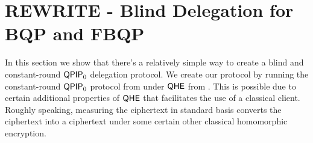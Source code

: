 \section{REWRITE - Blind Delegation for BQP and FBQP}
\label{sec:BlindBQP2}

In this section we show that there's a relatively simple way to create a blind and constant-round $\operatorname{\mathsf{QPIP}}_0$ delegation protocol. We create our protocol by running the constant-round $\operatorname{\mathsf{QPIP}}_0$ protocol from \cite{FOCS:Mahadev18a} under $\mathsf{QHE}$ from \cite{mahadev_qfhe}. This is possible due to certain additional properties of $\mathsf{QHE}$ that facilitates the use of a classical client. Roughly speaking, measuring the ciphertext in standard basis converts the ciphertext into a ciphertext under some certain other classical homomorphic encryption.

\def\HE{\mathsf{HE}}
\def\HGen{\mathsf{HE.Keygen}}
\def\HEnc{\mathsf{HE.Enc}}
\def\HEval{\mathsf{HE.Eval}}
\def\HDec{\mathsf{HE.Dec}}

